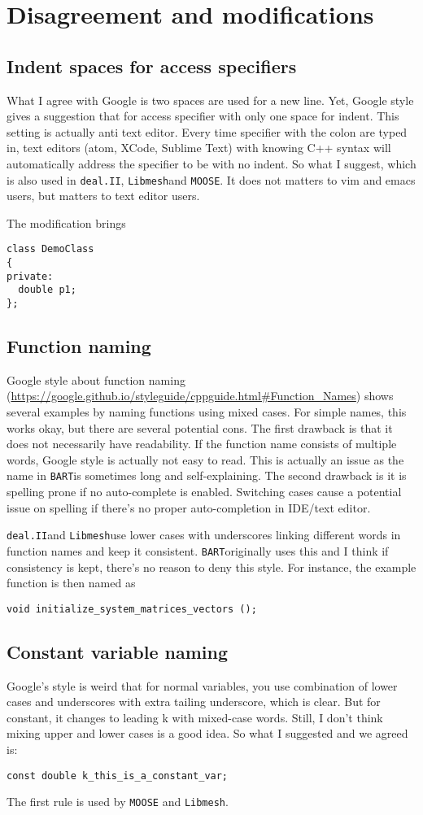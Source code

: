 \documentclass[openany]{book}
\newcommand{\bart}{{\tt BART}}
\newcommand{\libmesh}{{\tt Libmesh}}
\newcommand{\dealii}{{\tt deal.II}}
\newcommand{\moose}{{\tt MOOSE}}
\begin{document}
\section{Disagreement and modifications}
\subsection{Indent spaces for access specifiers}
What I agree with Google is two spaces are used for a new line. Yet, Google style gives a suggestion that for access specifier with only one space for indent. This setting is actually anti text editor. Every time specifier with the colon are typed in, text editors (atom, XCode, Sublime Text) with knowing C++ syntax will automatically address the specifier to be with no indent. So what I suggest, which is also used in \dealii, \libmesh and \moose. It does not matters to vim and emacs users, but matters to text editor users.

The modification brings
\begin{lstlisting}
class DemoClass
{
private:
  double p1;
};
\end{lstlisting}
\subsection{Function naming}
Google style about function naming (\url{https://google.github.io/styleguide/cppguide.html#Function_Names}) shows several examples by naming functions using mixed cases. For simple names, this works okay, but there are several potential cons.
The first drawback is that it does not necessarily have readability. If the function name consists of multiple words, Google style is actually not easy to read. This is actually an issue as the name in \bart is sometimes long and self-explaining. The second drawback is it is spelling prone if no auto-complete is enabled. Switching cases cause a potential issue on spelling if there's no proper auto-completion in IDE/text editor.

\dealii and \libmesh use lower cases with underscores linking different words in function names and keep it consistent. \bart originally uses this and I think if consistency is kept, there's no reason to deny this style. For instance, the example function is then named as
\begin{lstlisting}
void initialize_system_matrices_vectors ();
\end{lstlisting}
\subsection{Constant variable naming}
Google's style is weird that for normal variables, you use combination of lower cases and underscores with extra tailing underscore, which is clear. But for constant, it changes to leading k with mixed-case words. Still, I don't think mixing upper and lower cases is a good idea. So what I suggested and we agreed is:
\begin{lstlisting}
const double k_this_is_a_constant_var;
\end{lstlisting}
The first rule is used by {\tt MOOSE} and \libmesh.
\end{document}

